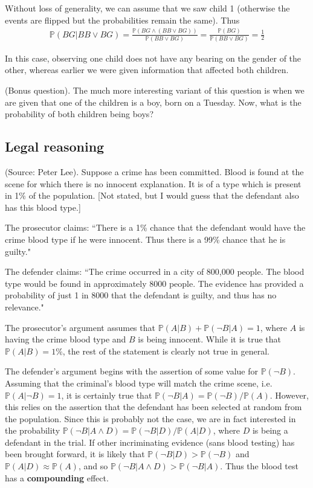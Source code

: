 \documentclass{article}
\begin{document}
Without loss of generality, we can assume that we saw child 1 (otherwise the events are flipped but the probabilities remain the same). Thus
\begin{gather*}
\mathbb{P}(BG | BB \lor BG) = \frac{\mathbb{P}(BG \land (BB \lor BG))}{\mathbb{P}(BB \lor BG)} = \frac{\mathbb{P}(BG)}{\mathbb{P}(BB \lor BG)} = \frac{1}{2}
\end{gather*}

In this case, observing one child does not have any bearing on the gender of the other, whereas earlier we were given information that affected both children.

(Bonus question). The much more interesting variant of this question is when we are given that one of the children is a boy, born on a Tuesday. Now, what is the probability of both children being boys?

\subsection{Legal reasoning}
(Source: Peter Lee). Suppose a crime has been committed. Blood is found at the scene for which there is no innocent explanation. It is of a type which is present in 1\% of the population. [Not stated, but I would guess that the defendant also has this blood type.]

The prosecutor claims: ``There is a 1\% chance that the defendant would have the crime blood type if he were innocent. Thus there is a 99\% chance that he is guilty."

The defender claims: ``The crime occurred in a city of 800,000 people. The blood type would be found in approximately 8000 people. The evidence has provided a probability of just 1 in 8000 that the defendant is guilty, and thus has no relevance."

The prosecutor's argument assumes that $\mathbb{P}(A|B) + \mathbb{P}(\neg B|A) = 1$, where $A$ is having the crime blood type and $B$ is being innocent. While it is true that $\mathbb{P}(A|B)=1\%$, the rest of the statement is clearly not true in general.

The defender's argument begins with the assertion of some value for $\mathbb{P}(\neg B)$. Assuming that the criminal's blood type will match the crime scene, i.e. $\mathbb{P}(A|\neg B) = 1$, it is certainly true that $\mathbb{P}(\neg B|A) = \mathbb{P}(\neg B)/\mathbb{P}(A)$. However, this relies on the assertion that the defendant has been selected at random from the population. Since this is probably not the case, we are in fact interested in the probability $\mathbb{P}(\neg B|A \land D) = \mathbb{P}(\neg B| D)/\mathbb{P}(A|D)$, where $D$ is being a defendant in the trial. If other incriminating evidence (sans blood testing) has been brought forward, it is likely that $\mathbb{P}(\neg B|D) > \mathbb{P}(\neg B)$ and $\mathbb{P}(A|D) \approx \mathbb{P}(A)$, and so $\mathbb{P}(\neg B|A \land D) > \mathbb{P}(\neg B|A)$. Thus the blood test has a \textbf{compounding} effect.
\end{document}

